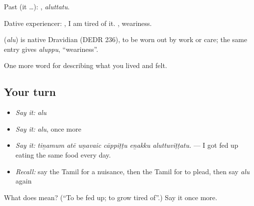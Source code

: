 Past (it …): , \emph{aluttatu}.

Dative experiencer:  , I am tired of it. , weariness.

\begin{cousinweb}
\textbf{} (\emph{alu}) is native Dravidian (DEDR 236), to be worn out by work or care; the same entry gives  \emph{aluppu}, \textquotedblleft{}weariness\textquotedblright{}.
\end{cousinweb}

\begin{grammarlens}[title={What you've built}]
One more word for describing what you lived and felt.
\end{grammarlens}

\subsection*{Your turn}
\begin{itemize}
\raggedright
  \item \emph{Say it:} \emph{alu}
  \item \emph{Say it:} \emph{alu}, once more
  \item \emph{Say it:} \emph{tiṉamum atē uṇavaic cāppiṭṭu eṉakku aluttuviṭṭatu.} — I got fed up eating the same food every day.
  \item \emph{Recall:} say the Tamil for a nuisance, then the Tamil for to plead, then say \emph{alu} again
\end{itemize}

\begin{tcolorbox}[breakable,colback=teal!4,colframe=teal!35!black,title={Before you move on}]
What does  mean? (\textquotedblleft{}To be fed up; to grow tired of\textquotedblright{}.) Say it once more.
\end{tcolorbox}
